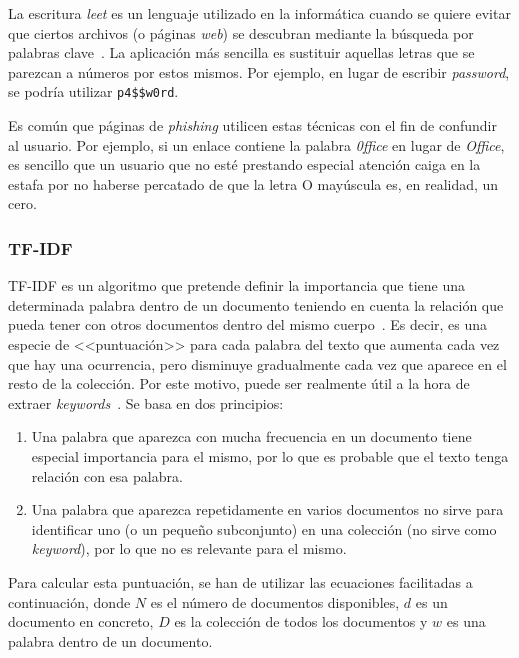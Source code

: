 La escritura \textit{leet} es un lenguaje utilizado en la informática cuando se quiere evitar que ciertos archivos (o páginas \textit{web}) se descubran mediante la búsqueda por palabras clave~\cite{leetSpectrum}. La aplicación más sencilla es sustituir aquellas letras que se parezcan a números por estos mismos. Por ejemplo, en lugar de escribir \textit{password}, se podría utilizar \texttt{p4\$\$w0rd}.

Es común que páginas de \textit{phishing} utilicen estas técnicas con el fin de confundir al usuario. Por ejemplo, si un enlace contiene la palabra \textit{0ffice} en lugar de \textit{Office}, es sencillo que un usuario que no esté prestando especial atención caiga en la estafa por no haberse percatado de que la letra O mayúscula es, en realidad, un cero.

\subsubsection{TF-IDF}

TF-IDF es un algoritmo que pretende definir la importancia que tiene una determinada palabra dentro de un documento teniendo en cuenta la relación que pueda tener con otros documentos dentro del mismo cuerpo~\cite{tfidfmarius2020}. Es decir, es una especie de <<puntuación>> para cada palabra del texto que aumenta cada vez que hay una ocurrencia, pero disminuye gradualmente cada vez que aparece en el resto de la colección. Por este motivo, puede ser realmente útil a la hora de extraer \textit{keywords}~\cite{cantinatfidf}. Se basa en dos principios:

\begin{enumerate}
	\item Una palabra que aparezca con mucha frecuencia en un documento tiene especial importancia para el mismo, por lo que es probable que el texto tenga relación con esa palabra.
	\item Una palabra que aparezca repetidamente en varios documentos no sirve para identificar uno (o un pequeño subconjunto) en una colección (no sirve como \textit{keyword}), por lo que no es relevante para el mismo.
\end{enumerate}

Para calcular esta puntuación, se han de utilizar las ecuaciones facilitadas a continuación, donde $N$ es el número de documentos disponibles, $d$ es un documento en concreto, $D$ es la colección de todos los documentos y $w$ es una palabra dentro de un documento.

